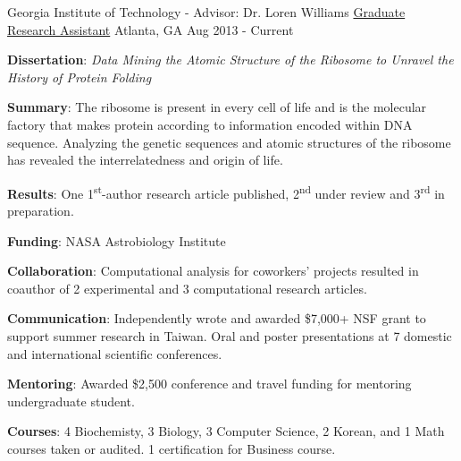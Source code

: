 

\begin{cventries}

  \cventry
    {Georgia Institute of Technology - Advisor: Dr. Loren Williams} %
    {\href{https://scholar.google.com/citations?hl=en&user=KIFFrX4AAAAJ&view_op=list_works&gmla=AJsN-F6ZS9ZeLqMG4o6JCZS87HLjoP76wA4kFValw4xx0A6ZWJJoxCWe2xu6VZvt_LgEw9YpCglVTlKY_5PfKpxiyghYFxLPNm5zrUwdBE5Fn-Sr098nt7NJGM2cH5l47IrTsSra8Vob}{Graduate Research Assistant}} %
    {Atlanta, GA} %
    {Aug 2013 - Current} %
    {{\textbf{Dissertation}: \textit{Data Mining the Atomic Structure of the Ribosome to Unravel the History of Protein Folding}}
      \begin{cvitems} %
      \vspace{4.0mm}
        \item \textbf{Summary}: The ribosome is present in every cell of life and is the molecular factory that makes protein according to information encoded within DNA sequence. Analyzing the genetic sequences and atomic structures of the ribosome has revealed the interrelatedness and origin of life.
        \item \textbf{Results}: One 1\textsuperscript{st}-author research article published, 2\textsuperscript{nd} under review and 3\textsuperscript{rd} in preparation.
        \item \textbf{Funding}: NASA Astrobiology Institute
        \item \textbf{Collaboration}: Computational analysis for coworkers' projects resulted in coauthor of 2 experimental and 3 computational research articles.
        \item \textbf{Communication}: Independently wrote and awarded \$7,000+ NSF grant to support summer research in Taiwan. Oral and poster presentations at 7 domestic and international scientific conferences.
        \item \textbf{Mentoring}: Awarded \$2,500 conference and travel funding for mentoring undergraduate student.
        \item \textbf{Courses}: 4 Biochemisty, 3 Biology, 3 Computer Science, 2 Korean, and 1 Math courses taken or audited. 1 certification for Business course. 
      \end{cvitems}
    }


\end{cventries}
